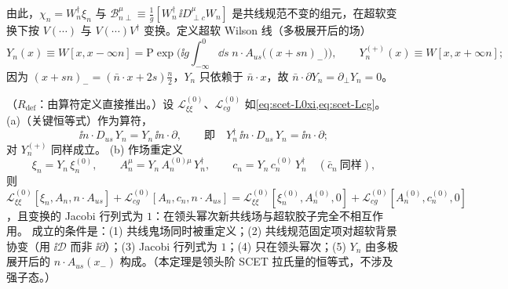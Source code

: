 由此，$\chi_n=W_n^\dagger\xi_n$ 与 $\mathcal B^\mu_{n\perp}\equiv\frac1g[W_n^\dagger\,\ii D^\mu_{\perp c}W_n]$ 是共线规范不变的组元，在超软变换下按 $V(\cdots)$ 与 $V(\cdots)V^\dagger$ 变换。定义超软 Wilson 线（多极展开后的场）
\begin{equation}\label{eq:scet-Yn}
Y_n(x)\equiv W[x,x-\infty n]=\mathrm P\exp\Big(\ii g\int_{-\infty}^0\dd s\;n\cdot A_{us}\big((x+sn)_-\big)\Big),\qquad
Y_n^{(+)}(x)\equiv W[x,x+\infty n];
\end{equation}
因为 $(x+sn)_-=(\bar n\cdot x+2s)\frac n2$，$Y_n$ 只依赖于 $\bar n\cdot x$，故 $\bar n\cdot\partial Y_n=\partial_\perp Y_n=0$。

\begin{theorem}\label{thm:scet-decoupling}
（$R_{\mathrm{def}}$：由算符定义直接推出。）设 $\mathcal L^{(0)}_{\xi\xi}$、$\mathcal L^{(0)}_{cg}$ 如\cref{eq:scet-L0xi,eq:scet-Lcg}。
(a)（关键恒等式）作为算符，
\begin{equation}\label{eq:scet-key}
\ii n\cdot D_{us}\,Y_n=Y_n\,\ii n\cdot\partial,\qquad\text{即}\quad Y_n^\dagger\,\ii n\cdot D_{us}\,Y_n=\ii n\cdot\partial ;
\end{equation}
对 $Y_n^{(+)}$ 同样成立。
(b) 作场重定义
\begin{equation}\label{eq:scet-BPS}
\xi_n=Y_n\,\xi_n^{(0)},\qquad A_n^\mu=Y_n\,A_n^{(0)\mu}\,Y_n^\dagger,\qquad c_n=Y_n\,c_n^{(0)}\,Y_n^\dagger\quad(\bar c_n\ \text{同样}),
\end{equation}
则 $\mathcal L^{(0)}_{\xi\xi}[\xi_n,A_n,n\cdot A_{us}]+\mathcal L^{(0)}_{cg}[A_n,c_n,n\cdot A_{us}]=\mathcal L^{(0)}_{\xi\xi}[\xi^{(0)}_n,A^{(0)}_n,0]+\mathcal L^{(0)}_{cg}[A^{(0)}_n,c^{(0)}_n,0]$，且变换的 Jacobi 行列式为 $1$：在领头幂次新共线场与超软胶子完全不相互作用。
成立的条件是：(1) 共线鬼场同时被重定义；(2) 共线规范固定项对超软背景协变（用 $\ii\mathcal D$ 而非 $\ii\partial$）；(3) Jacobi 行列式为 $1$；(4) 只在领头幂次；(5) $Y_n$ 由多极展开后的 $n\cdot A_{us}(x_-)$ 构成。（本定理是领头阶 SCET 拉氏量的恒等式，不涉及强子态。）
\end{theorem}

